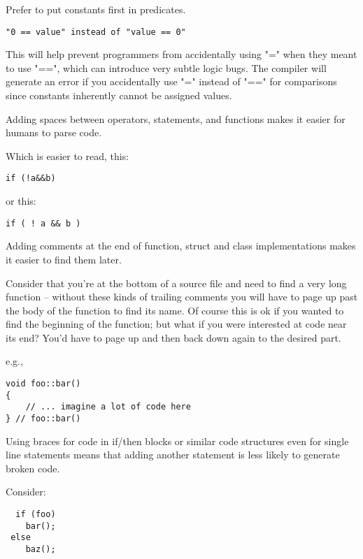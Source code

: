 Prefer to put constants first in predicates. 

\begin{verbatim}
"0 == value" instead of "value == 0"
\end{verbatim}

This will help prevent programmers from accidentally using "=" when they meant
to use "==", which can introduce very subtle logic bugs.  The compiler will
generate an error if you accidentally use "=" instead of "==" for comparisons
since constants inherently cannot be assigned values.

Adding spaces between operators, statements, and functions makes it easier for
humans to parse code.

Which is easier to read, this:

\begin{verbatim}
if (!a&&b)
\end{verbatim}

or this:

\begin{verbatim}
if ( ! a && b )
\end{verbatim}

Adding comments at the end of function, struct and class implementations makes
it easier to find them later.

Consider that you're at the bottom of a source file and need to find a very
long function -- without these kinds of trailing comments you will have to page
up past the body of the function to find its name.  Of course this is ok if you
wanted to find the beginning of the function; but what if you were interested
at code near its end?  You'd have to page up and then back down again to the
desired part.

e.g.,

\begin{verbatim}
void foo::bar()
{ 
    // ... imagine a lot of code here 
} // foo::bar()
\end{verbatim}

Using braces for code in if/then blocks or similar code structures even for
single line statements means that adding another statement is less likely to
generate broken code.

Consider:

\begin{verbatim}
  if (foo)
    bar();
 else
    baz();
\end{verbatim}

